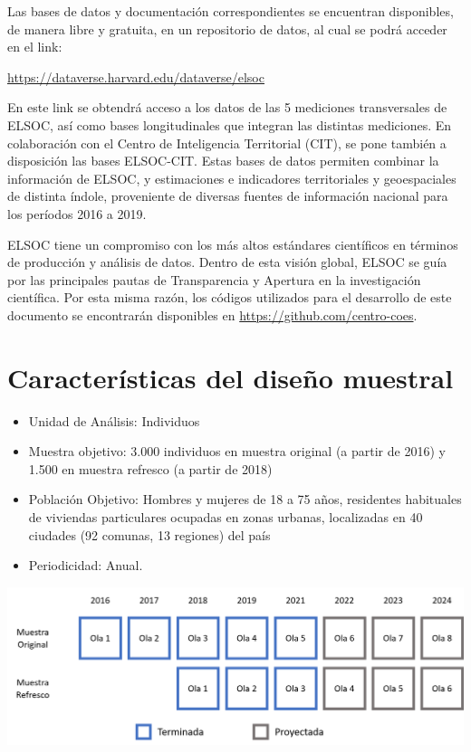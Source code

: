 \documentclass[
  12pt,
]{book}
\begin{document}
Las bases de datos y documentación correspondientes se encuentran disponibles, de manera libre y gratuita, en un repositorio de datos, al cual se podrá acceder en el link:

\url{https://dataverse.harvard.edu/dataverse/elsoc}

En este link se obtendrá acceso a los datos de las 5 mediciones transversales de ELSOC, así como bases longitudinales que integran las distintas mediciones. En colaboración con el Centro de Inteligencia Territorial (CIT), se pone también a disposición las bases ELSOC-CIT. Estas bases de datos permiten combinar la información de ELSOC, y estimaciones e indicadores territoriales y geoespaciales de distinta índole, proveniente de diversas fuentes de información nacional para los períodos 2016 a 2019.

ELSOC tiene un compromiso con los más altos estándares científicos en términos de producción y análisis de datos. Dentro de esta visión global, ELSOC se guía por las principales pautas de Transparencia y Apertura en la investigación científica. Por esta misma razón, los códigos utilizados para el desarrollo de este documento se encontrarán disponibles en \url{https://github.com/centro-coes}.

\hypertarget{caracteruxedsticas-del-diseuxf1o-muestral}{%
\section{Características del diseño muestral}\label{caracteruxedsticas-del-diseuxf1o-muestral}}

\begin{itemize}
\item
  Unidad de Análisis: Individuos
\item
  Muestra objetivo: 3.000 individuos en muestra original (a partir de 2016) y 1.500 en muestra refresco (a partir de 2018)
\item
  Población Objetivo: Hombres y mujeres de 18 a 75 años, residentes habituales de viviendas particulares ocupadas en zonas urbanas, localizadas en 40 ciudades (92 comunas, 13 regiones) del país
\item
  Periodicidad: Anual.
\end{itemize}

\includegraphics[width=22.1in]{1_input/imagenes/olas_elsoc}
\end{document}
